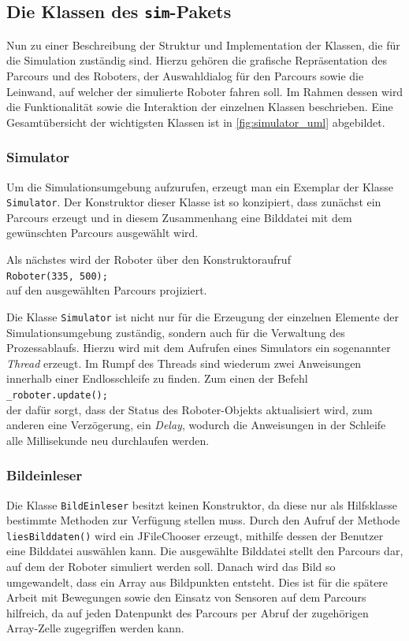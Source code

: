 \documentclass[paper=a4, DIV=calc, BCOR=12mm, twoside=on, onecolumn=on, open = right, titlepage =on, parskip =half-, headsepline = on, footsepline = off, chapterprefix = off, appendixprefix = on, fontsize = 12pt, numbers = noenddot, abstract = on]{scrbook}
\begin{document}
\par \singlespacing
\subsection{Die Klassen des \texttt{sim}-Pakets}
\label{sec:simpaket}
\onehalfspacing
Nun zu einer Beschreibung der Struktur und Implementation der Klassen, die für die Simulation zuständig sind. Hierzu gehören die grafische Repräsentation des Parcours und des Roboters, der Auswahldialog für den Parcours sowie die Leinwand, auf welcher der simulierte Roboter fahren soll. Im Rahmen dessen wird die Funktionalität sowie die Interaktion der einzelnen Klassen beschrieben. Eine Gesamtübersicht der wichtigsten Klassen ist in \ref{fig:simulator_uml} abgebildet.

\vspace*{-2ex}
\subsubsection{Simulator}

Um die Simulationsumgebung aufzurufen, erzeugt man ein Exemplar der Klasse \texttt{Si\-mu\-la\-tor}. Der Konstruktor dieser Klasse ist so konzipiert, dass zunächst ein Parcours erzeugt und in diesem Zusammenhang eine Bilddatei mit dem gewünschten Parcours ausgewählt wird.

Als nächstes wird der Roboter über den Konstruktoraufruf\\
\hspace*{2em}\texttt{Roboter(335, 500);}\\
auf den ausgewählten Parcours projiziert.

Die Klasse \texttt{Simulator} ist nicht nur für die Erzeugung der einzelnen Elemente der Simulationsumgebung zuständig, sondern auch für die Verwaltung des Prozessablaufs. Hierzu wird mit dem Aufrufen eines Simulators ein sogenannter \emph{Thread} erzeugt. Im Rumpf des Threads sind wiederum zwei Anweisungen innerhalb einer Endlosschleife zu finden. Zum einen der Befehl\\
\hspace*{2em} \texttt{{\_}roboter.update();}\\
der dafür sorgt, dass der Status des Roboter-Objekts aktualisiert wird, zum anderen eine Verzögerung, ein \emph{Delay}, wodurch die Anweisungen in der Schleife alle Millisekunde neu durchlaufen werden. 


\subsubsection{Bildeinleser}
Die Klasse \texttt{BildEinleser} besitzt keinen Konstruktor, da diese nur als Hilfsklasse bestimmte Methoden zur Verfügung stellen muss. Durch den Aufruf der Methode
\texttt{liesBilddaten()} wird ein JFileChooser erzeugt, mithilfe dessen der Benutzer eine Bilddatei auswählen kann. Die ausgewählte Bilddatei stellt den Parcours dar, auf dem der Roboter simuliert werden soll. Danach wird das Bild so umgewandelt, dass ein Array aus Bildpunkten entsteht. Dies ist für die spätere Arbeit mit Bewegungen sowie den Einsatz von Sensoren auf dem Parcours hilfreich, da auf jeden Datenpunkt des Parcours per Abruf der zugehörigen Array-Zelle zugegriffen werden kann.
\end{document}
